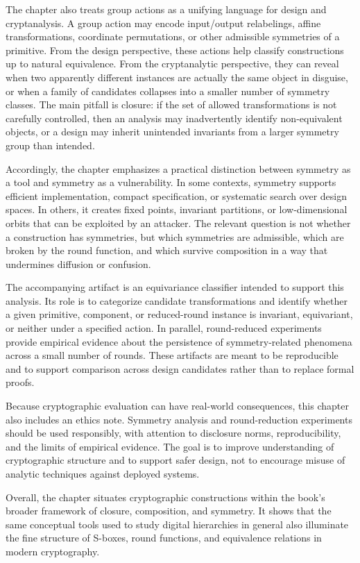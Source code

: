 The chapter also treats group actions as a unifying language for design and cryptanalysis. A group action may encode input/output relabelings, affine transformations, coordinate permutations, or other admissible symmetries of a primitive. From the design perspective, these actions help classify constructions up to natural equivalence. From the cryptanalytic perspective, they can reveal when two apparently different instances are actually the same object in disguise, or when a family of candidates collapses into a smaller number of symmetry classes. The main pitfall is closure: if the set of allowed transformations is not carefully controlled, then an analysis may inadvertently identify non-equivalent objects, or a design may inherit unintended invariants from a larger symmetry group than intended.

Accordingly, the chapter emphasizes a practical distinction between symmetry as a tool and symmetry as a vulnerability. In some contexts, symmetry supports efficient implementation, compact specification, or systematic search over design spaces. In others, it creates fixed points, invariant partitions, or low-dimensional orbits that can be exploited by an attacker. The relevant question is not whether a construction has symmetries, but which symmetries are admissible, which are broken by the round function, and which survive composition in a way that undermines diffusion or confusion.

The accompanying artifact is an equivariance classifier intended to support this analysis. Its role is to categorize candidate transformations and identify whether a given primitive, component, or reduced-round instance is invariant, equivariant, or neither under a specified action. In parallel, round-reduced experiments provide empirical evidence about the persistence of symmetry-related phenomena across a small number of rounds. These artifacts are meant to be reproducible and to support comparison across design candidates rather than to replace formal proofs.

Because cryptographic evaluation can have real-world consequences, this chapter also includes an ethics note. Symmetry analysis and round-reduction experiments should be used responsibly, with attention to disclosure norms, reproducibility, and the limits of empirical evidence. The goal is to improve understanding of cryptographic structure and to support safer design, not to encourage misuse of analytic techniques against deployed systems.

Overall, the chapter situates cryptographic constructions within the book's broader framework of closure, composition, and symmetry. It shows that the same conceptual tools used to study digital hierarchies in general also illuminate the fine structure of S-boxes, round functions, and equivalence relations in modern cryptography.

